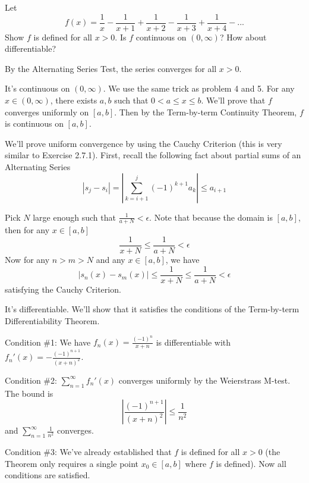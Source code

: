 \documentclass{oxmathproblems}
\begin{document}
\begin{questions}
\miquestion Let
\[f(x) = \frac{1}{x} - \frac{1}{x+1} + \frac{1}{x+2} - \frac{1}{x+3} + \frac{1}{x+4} - ...\]
Show $f$ is defined for all $x > 0$. Is $f$ continuous on $(0, \infty)$? How about differentiable?

\begin{solution}
  By the Alternating Series Test, the series converges for all $x > 0$.
  
  It's continuous on $(0, \infty)$. We use the same trick as problem 4 and 5. For any $x \in (0, \infty)$, there exists $a, b$ such that $0 < a \leq x \leq b$.
  We'll prove that $f$ converges uniformly on $[a, b]$. Then by the Term-by-term Continuity Theorem, $f$ is continuous on $[a, b]$.

  We'll prove uniform convergence by using the Cauchy Criterion (this is very similar to Exercise 2.7.1).
  First, recall the following fact about partial sums of an Alternating Series
  \[|s_j - s_{i}| = |\sum_{k=i+1}^{j}(-1)^{k+1}a_{k}| \leq a_{i+1}\]

  Pick $N$ large enough such that $\frac{1}{a+N} < \epsilon$. Note that because the domain is $[a, b]$, then for any $x \in [a, b]$
  \[\frac{1}{x+N} \leq \frac{1}{a+N} < \epsilon\] 
  Now for any $n > m > N$ and any $x \in [a, b]$, we have
  \[|s_{n}(x)-s_{m}(x)| \leq \frac{1}{x+N} \leq \frac{1}{a+N} < \epsilon\]
  satisfying the Cauchy Criterion.

  It's differentiable. We'll show that it satisfies the conditions of the Term-by-term Differentiability Theorem.
  
  Condition \#1: We have $f_{n}(x)=\frac{(-1)^n}{x+n}$ is differentiable with $f_{n}'(x)=-\frac{(-1)^{n+1}}{(x+n)^2}$.

  Condition \#2: $\sum_{n=1}^{\infty}f_{n}'(x)$ converges uniformly by the Weierstrass M-test. The bound is
  \[\left|\frac{(-1)^{n+1}}{(x+n)^2}\right| \leq \frac{1}{n^2}\]
  and $\sum_{n=1}^{\infty}\frac{1}{n^2}$ converges.

  Condition \#3: We've already established that $f$ is defined for all $x > 0$ (the Theorem only requires a single point $x_{0} \in [a, b]$ where $f$ is defined).
  Now all conditions are satisfied.
\end{solution}

\end{questions}
\end{document}
